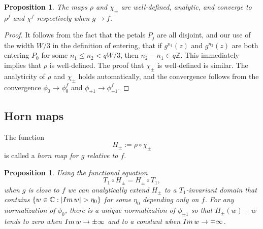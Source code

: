 \documentclass[12pt,letterpaper]{amsart}
\numberwithin{equation}{section}
\newtheorem{prop}[equation]{Proposition}
\newtheorem{proposition}[equation]{Proposition}
\theoremstyle{remark}
\theoremstyle{definition}
\newcommand{\Z}{\mathbb Z}
\DeclareMathOperator{\Dom}{Dom}
\begin{document}
	
	\begin{proposition}\label{prop:extensions}
		The maps $\rho$ and $\chi_\pm$ are well-defined, analytic, and converge to $\rho^f$ and $\chi^f$ respectively when $g\to f$. 
	\end{proposition}
	
	\begin{proof}
		It follows from the fact that the petals $P_j$ are all disjoint, and our use of the width $W/3$ in the definition of entering, that if $g^{n_1}(z)$ and  $g^{n_2}(z)$ are both  entering $P_0$ for some $n_1\leq n_2< qW/3$, then $n_2-n_1\in q\Z$. This immediately implies that $\rho$ is well-defined. The proof that $\chi_\pm$ is well-defined is similar.
		The analyticity of $\rho$ and $\chi_\pm$ holds automatically, and the convergence follows from the convergence $\phi_0\to\phi_0^f$ and  $\phi_{\pm 1}\to \phi_{\pm 1}^f$.  
	\end{proof}

	
%	
%	


	
	

	
	
	\subsection{Horn maps}
	
	The function $$H_\pm:= \rho\circ \chi_\pm$$
	is called a  \textit{horn map for $g$ relative to $f$}.
	
	
		\begin{proposition}\label{horn maps perturbed}
			Using the functional equation 
			$$T_1\circ H_\pm= H_\pm\circ T_1,$$
			when $g$ is close to $f$ we can analytically extend  $H_\pm$ to a $T_1$-invariant domain that contains $\{w\in \mathbb{C}: |\emph{Im}\,w|> \eta_0\}$ for some $\eta_0$ depending only on $f$.
			For any normalization of $\phi_0$, there is a unique normalization of $\phi_{\pm 1}$ so that $H_\pm(w)-w$ tends to zero when $\emph{Im}\,w\to \pm \infty$ and to a constant when $\emph{Im}\,w\to \mp\infty$.
	\end{proposition}
	
\end{document}
